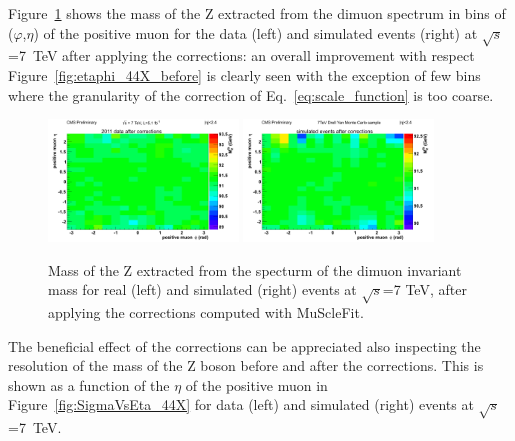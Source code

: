 Figure~\ref{fig:etaphi_44X_after} shows the 
mass of the Z extracted from the dimuon spectrum in bins of
($\varphi$,$\eta$) of the positive muon for the data (left) and simulated
events (right) at $\sqrt{s}$=7~TeV after applying the corrections: 
an overall improvement with respect Figure~\ref{fig:etaphi_44X_before}
is clearly seen with the exception of few bins where the granularity
of the correction of Eq.~\ref{eq:scale_function} is too coarse.
\begin{figure}[hbtp]  
\begin{center}
\includegraphics[width=0.45\textwidth]{figures/TkAl_Style/Data2011_44X/MassVsEtaPhiPlus_file1}
\includegraphics[width=0.45\textwidth]{figures/TkAl_Style/MC2011_44X/MassVsEtaPhiPlus_file1}
 \hspace{1cm} 
   \caption{Mass of the Z extracted from the specturm of the dimuon
     invariant mass for real (left) and simulated (right) events at $\sqrt{s}$=7 TeV, after
     applying the corrections computed with MuScleFit.
   \label{fig:etaphi_44X_after}}
 \end{center}
\end{figure} 
The beneficial effect of the corrections can be appreciated also
inspecting the resolution of the mass of the Z boson before and after the
corrections. This is shown as a function of the $\eta$ of the positive
muon in Figure~\ref{fig:SigmaVsEta_44X} for data (left) and simulated (right) events 
at $\sqrt{s}$=7~TeV. 
